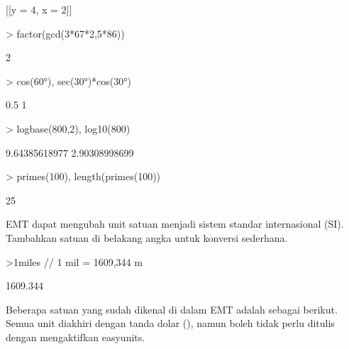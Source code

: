 \begin{eulernotebook}
\begin{euleroutput}
                             [2 x - y, 2 - x]
  
  
                             [[y = 4, x = 2]]
  
    \end{euleroutput}
    \begin{eulerprompt}
> factor(gcd(3*67*2,5*86))
    \end{eulerprompt}
    \begin{euleroutput}
  2
    \end{euleroutput}
    \begin{eulerprompt}
> cos(60°), sec(30°)*cos(30°)
    \end{eulerprompt}
    \begin{euleroutput}
  0.5
  1
    \end{euleroutput}
    \begin{eulerprompt}
> logbase(800,2), log10(800)
    \end{eulerprompt}
    \begin{euleroutput}
  9.64385618977
  2.90308998699
    \end{euleroutput}
    \begin{eulerprompt}
> primes(100), length(primes(100))
    \end{eulerprompt}
    \begin{euleroutput}
  [2,  3,  5,  7,  11,  13,  17,  19,  23,  29,  31,  37,  41,  43,  47,
  53,  59,  61,  67,  71,  73,  79,  83,  89,  97]
  25
    \end{euleroutput}

    \begin{eulercomment}
        EMT dapat mengubah unit satuan menjadi sistem standar internasional
        (SI). Tambahkan satuan di belakang angka untuk konversi sederhana.
    \end{eulercomment}
    \begin{eulerprompt}
>1miles  // 1 mil = 1609,344 m
    \end{eulerprompt}
    \begin{euleroutput}
  1609.344
    \end{euleroutput}
    \begin{eulercomment}
        Beberapa satuan yang sudah dikenal di dalam EMT adalah sebagai
        berikut. Semua unit diakhiri dengan tanda dolar (\textdollar{}), namun boleh tidak
        perlu ditulis dengan mengaktifkan easyunits. 


\end{eulercomment}
\end{eulernotebook}
